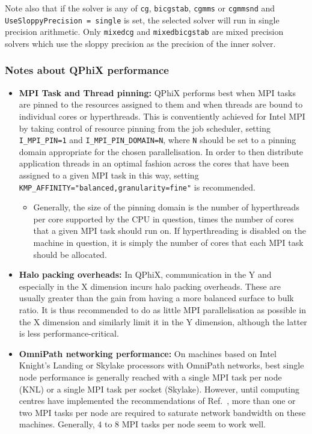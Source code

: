 Note also that if the solver is any of \texttt{cg}, \texttt{bicgstab}, \texttt{cgmms} or \texttt{cgmmsnd} and \texttt{UseSloppyPrecision = single} is set, the selected solver will run in single precision arithmetic.
Only \texttt{mixedcg} and \texttt{mixedbicgstab} are mixed precision solvers which use the sloppy precision as the precision of the inner solver.

\subsubsection{Notes about QPhiX performance}

\begin{itemize}
  \item{\textbf{MPI Task and Thread pinning:} QPhiX performs best when MPI tasks are pinned to the resources assigned to them and when threads are bound to individual cores or hyperthreads. This is conventiently achieved for Intel MPI by taking control of resource pinning from the job scheduler, setting \texttt{I\_MPI\_PIN=1} and \texttt{I\_MPI\_PIN\_DOMAIN=N}, where \texttt{N} should be set to a pinning domain appropriate for the chosen parallelisation. In order to then distribute application threads in an optimal fashion across the cores that have been assigned to a given MPI task in this way, setting \texttt{KMP\_AFFINITY="balanced,granularity=fine"} is recommended.}
  \begin{itemize}
    \item{Generally, the size of the pinning domain is the number of hyperthreads per core supported by the CPU in question, times the number of cores that a given MPI task should run on. If hyperthreading is disabled on the machine in question, it is simply the number of cores that each MPI task should be allocated.}
  \end{itemize}
  \item{\textbf{Halo packing overheads:} In QPhiX, communication in the Y and especially in the X dimension incurs halo packing overheads. These are usually greater than the gain from having a more balanced surface to bulk ratio. It is thus recommended to do as little MPI parallelisation as possible in the X dimension and similarly limit it in the Y dimension, although the latter is less performance-critical.}
  \item{\textbf{OmniPath networking performance:} On machines based on Intel Knight's Landing or Skylake processors with OmniPath networks, best single node performance is generally reached with a single MPI task per node (KNL) or a single MPI task per socket (Skylake). However, until computing centres have implemented the recommendations of Ref.~\cite{Boyle:2017xcy}, more than one or two MPI tasks per node are required to saturate network bandwidth on these machines. Generally, $4$ to $8$ MPI tasks per node seem to work well.}
\end{itemize}


